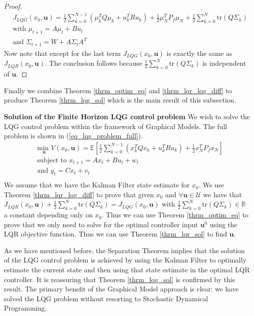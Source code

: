 \begin{proof}
\begin{equation}
\begin{aligned}
&J_{LQG}(x_0, \mathbf{u}) = \frac{1}{2}\sum_{k=0}^{N-1} \left( \mu_k^TQ\mu_k + u_k^TRu_k \right) + \frac{1}{2}\mu_N^TP_f\mu_N + \frac{1}{2}\sum_{k=0}^N \text{tr}(Q\Sigma_k) \\
&\text{with } \mu_{t+1} = A\mu_t +Bu_t \\
&\text{and } \Sigma_{t+1} = W+A\Sigma_t A^T 
\end{aligned}
\label{eq_simpl_obj_func}
\end{equation}
Now note that except for the last term $J_{LQG}(x_0, \mathbf{u})$ is exactly the same as $J_{LQR}(x_0, \mathbf{u})$. The conclusion follows because $\frac{1}{2}\sum_{k=0}^N \text{tr}(Q\Sigma_k)$ is independent of $\mathbf{u}$. 
\end{proof}
Finally we combine Theorem \ref{thrm_optim_eq} and \ref{thrm_lqr_lqg_diff} to produce Theorem \ref{thrm_lqg_sol} which is the main result of this subsection.
\begin{thrm}
\textbf{Solution of the Finite Horizon LQG control problem} We wish to solve the LQG control problem within the framework of Graphical Models. The full problem is shown in (\ref{eq_lqg_problem_full}).
\begin{equation}
\begin{aligned}
&\underset{\mathbf{u}}{\text{min }} V(x_0, \mathbf{u}) = \mathbb{E}\left[ \frac{1}{2}\sum_{k=0}^{N-1} \left( x_k^TQx_k + u_k^TRu_k \right) + \frac{1}{2}x_N^TP_fx_N \right] \\
& \text{subject to } x_{t+1}=Ax_t+Bu_t + w_t \\
& \text{and } y_{t}= Cx_t + v_t \\
\end{aligned}
\label{eq_lqg_problem_full}
\end{equation}
We assume that we have the Kalman Filter state estimate for $x_0$. We use Theorem \ref{thrm_lqr_lqg_diff} to prove that given $x_0$ and $\forall \mathbf{u} \in \mathcal{U}$ we have that $J_{LQR}(x_0, \mathbf{u}) + \frac{1}{2}\sum_{k=0}^N \text{tr}(Q\Sigma_k) = J_{LQG}(x_0, \mathbf{u})$ with $\frac{1}{2}\sum_{k=0}^N \text{tr}(Q\Sigma_k) \in \mathbb{R}$ a constant depending only on $x_0$. Thus we can use Theorem \ref{thrm_optim_eq} to prove that we only need to solve for the optimal controller input $\mathbf{u}^0$ using the LQR objective function. Thus we can use Theorem \ref{thrm_lqr_sol} to find $\mathbf{u}$. 
\label{thrm_lqg_sol}
\end{thrm}
As we have mentioned before, the Separation Theorem implies that the solution of the LQG control problem is achieved by using the Kalman Filter to optimally estimate the current state and then using that state estimate in the optimal LQR controller. It is reassuring that Theorem \ref{thrm_lqg_sol} is confirmed by this result. The primary benefit of the Graphical Model approach is clear: we have solved the LQG problem without resorting to Stochastic Dynamical Programming.

